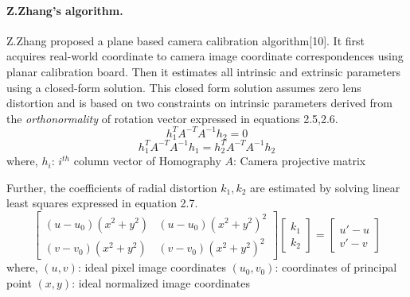 \paragraph{Z.Zhang's algorithm.}  
Z.Zhang proposed a plane based camera calibration algorithm[10]. It first acquires real-world coordinate to camera image coordinate correspondences using planar calibration board. Then it estimates all intrinsic and extrinsic parameters using a closed-form solution. This closed form solution assumes zero lens distortion and is based on two constraints on intrinsic parameters derived from the \textit{orthonormality} of rotation vector expressed in equations 2.5,2.6.  
\begin{equation}  
h_1^TA^{-T}A^{-1}h_2=0  
\end{equation}  
\begin{equation}  
h_1^TA^{-T}A^{-1}h_1=h_2^{T}A^{-T}A^{-1}h_2  
\end{equation}  
\noindent  
where,\newline  
$h_i$: $i^{th}$ column vector of Homography\newline  
$A$: Camera projective matrix\newline  
  

Further, the coefficients of radial distortion $k_1,k_2$ are estimated by solving linear least squares expressed in equation 2.7.  
\begin{equation}  
\begin{bmatrix}  
(u-u_0)(x^2+y^2) & (u-u_0)(x^2+y^2)^2 \\  
(v-v_0)(x^2+y^2) & (v-v_0)(x^2+y^2)^2  
\end{bmatrix}  
\begin{bmatrix}  
k_1 \\  
k_2  
\end{bmatrix}  
=\begin{bmatrix}  
u'-u \\  
v'-v  
\end{bmatrix}  
\end{equation}\newline  
\noindent  
where,\newline  
$(u,v)$: ideal pixel image coordinates\newline  
$(u_0,v_0)$: coordinates of principal point\newline  
$(x,y)$: ideal normalized image coordinates\newline  
  


